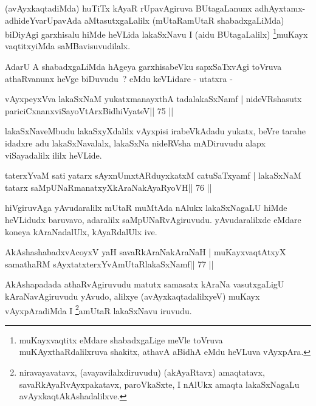 \begin{artha}
(avAyxkaqtadiMda) huTiTx kAyaR rUpavAgiruva BUtagaLanunx adhAyxtamx-adhideYvarUpavAda aMtasutxgaLalilx (mUtaRamUtaR   shabadxgaLiMda) biDiyAgi garxhisalu hiMde heVLida lakaSxNavu I (aidu   BUtagaLalilx) \footnote{muKayxvaqtitx eMdare shabadxgaLige meVle toVruva muKAyxthaRdalilxruva shakitx, athavA aBidhA eMdu heVLuva vAyxpAra.}muKayx vaqtitxyiMda saMBavisuvudilalx.
\end{artha}

\begin{artha}
AdarU A shabadxgaLiMda hAgeya garxhisabeVku sapxSaTxvAgi toVruva
athaRvanunx heVge biDuvudu~? eMdu keVLidare - utatxra -
\end{artha}

\begin{shl}
vAyxpeyxVva lakaSxNaM yukatxmanayxthA tadalakaSxNamf |
nideVRshasutx pariciCxnanxviSayoV\s tArxBidhiVyateV\hfill || 75 ||
\end{shl}

\begin{artha}
lakaSxNaveMbudu lakaSxyXdalilx vAyxpisi irabeVkAdadu yukatx, beVre tarahe idadxre adu lakaSxNavalalx, lakaSxNa nideRVsha mADiruvudu alapx viSayadalilx ililx heVLide.
\end{artha}


\begin{shl}
taterxYvaM sati yatarx sAyxnUmxtARduyxkatxM catuSaTxyamf |
lakaSxNaM tatarx saMpUNaRmanatxyXkAraNakAyaRyoVH\hfill || 76 ||
\end{shl}

\begin{artha}
hiVgiruvAga yAvudaralilx mUtaR muMtAda nAlukx lakaSxNagaLU hiMde
heVLidudx baruvavo, adaralilx saMpUNaRvAgiruvudu. yAvudaralilxde
eMdare koneya kAraNadalUlx, kAyaRdalUlx ive. 
\end{artha}


\begin{shl}
AkAshashabadxvAcoyxV yaH savaRkAraNakAraNaH |
muKayxvaqtAtxyX samathaRM sAyxtatxterxYvAmUtaRlakaSxNamf\hfill || 77 ||
\end{shl}

\begin{artha}
AkAshapadada athaRvAgiruvudu matutx samasatx kAraNa vasutxgaLigU kAraNavAgiruvudu yAvudo, alilxye (avAyxkaqtadalilxyeV) muKayx vAyxpAradiMda I \footnote{niravayavatavx, (avayavilalxdiruvudu)   (akAyaRtavx) amaqtatavx, savaRkAyaRvAyxpakatavx, paroVkaSxte, I   nAlUkx amaqta lakaSxNagaLu avAyxkaqtAkAshadalilxve.}amUtaR lakaSxNavu iruvudu.
\end{artha}


